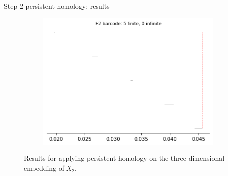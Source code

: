 \documentclass[xcolor={dvipsnames,svgnames}]{beamer}
\begin{document}
\begin{frame}{Step 2 persistent homology: results}
\begin{figure}[H]
\begin{subfigure}[b]{0.2\textwidth}
\includegraphics[width=\textwidth]{figures/X2_H2_barcode.png}
 \caption{}
\end{subfigure}
\caption{Results for applying persistent homology on the three-dimensional embedding of $X_2$.}
\end{figure}
\end{frame}
\end{document}
